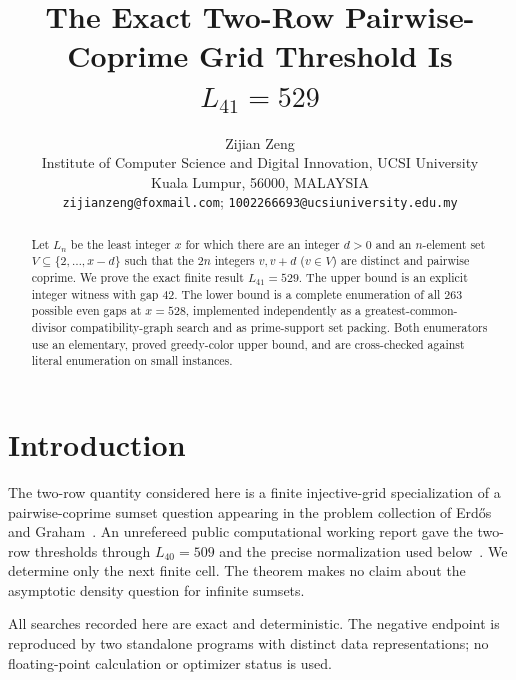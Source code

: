 \documentclass[11pt]{article}
\title{The Exact Two-Row Pairwise-Coprime Grid Threshold Is $L_{41}=529$}
\author{Zijian Zeng\\\small Institute of Computer Science and Digital Innovation, UCSI University\\\small Kuala Lumpur, 56000, MALAYSIA\\\small \texttt{zijianzeng@foxmail.com}; \texttt{1002266693@ucsiuniversity.edu.my}}
\date{}
\begin{document}
\maketitle
\begin{abstract}
Let $L_n$ be the least integer $x$ for which there are an integer $d>0$
and an $n$-element set $V\subseteq\{2,\ldots,x-d\}$ such that the $2n$
integers $v,v+d$ ($v\in V$) are distinct and pairwise coprime.  We prove the
exact finite result $L_{41}=529$.  The upper bound is an explicit integer
witness with gap $42$.  The lower bound is a complete enumeration of all
$263$ possible even gaps at $x=528$, implemented independently as a
greatest-common-divisor compatibility-graph search and as prime-support set
packing.  Both enumerators use an elementary, proved greedy-color upper bound,
and are cross-checked against literal enumeration on small instances.
\end{abstract}
\section{Introduction}
The two-row quantity considered here is a finite injective-grid specialization
of a pairwise-coprime sumset question appearing in the problem collection of
Erd\H{o}s and Graham~\cite[p.~85]{ErdosGraham1980}.  An unrefereed public
computational working report gave the two-row thresholds through $L_{40}=509$
and the precise normalization used below~\cite{White2026}.  We determine only
the next finite cell.  The theorem makes no claim about the asymptotic density
question for infinite sumsets.

All searches recorded here are exact and deterministic.  The negative
endpoint is reproduced by two standalone programs with distinct data
representations; no floating-point calculation or optimizer status is used.
\end{document}
